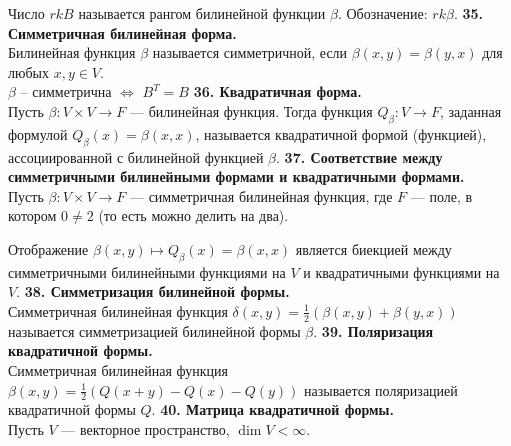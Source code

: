 \documentclass{article}
\begin{document}
Число $rk B$ называется рангом билинейной функции $\beta$. Обозначение: $rk \beta$.
\newline
\newline
\textbf{35. Симметричная билинейная форма.}\\
Билинейная функция $\beta$ называется симметричной, если $\beta(x, y) =\beta(y, x)$ для любых $x, y \in V$.\\
 $\beta$ -- симметрична $\Leftrightarrow$ $B^T=B$
\newline
\newline
\textbf{36. Квадратичная форма.}\\
Пусть $\beta \colon V\times V \rightarrow F$ --- билинейная функция. Тогда функция $Q_\beta \colon V \rightarrow F$, заданная формулой $Q_\beta(x) = \beta(x, x)$, называется квадратичной формой (функцией), ассоциированной с билинейной функцией $\beta$.
\newline
\newline
\textbf{37. Соответствие между симметричными билинейными формами и квадратичными формами.}\\
Пусть $\beta \colon V\times V \rightarrow F$ --- симметричная билинейная функция, где $F$ --- поле, в котором $0 \neq 2$ (то есть можно делить на два).

Отображение $\beta(x, y) \mapsto Q_\beta(x) = \beta(x, x)$ является биекцией между симметричными билинейными функциями на $V$ и квадратичными функциями на $V$.
\newline
\newline
\textbf{38. Симметризация билинейной формы.}\\
Симметричная билинейная функция $\delta(x, y) = \frac{1}{2}\left( \beta(x,y)+\beta(y,x)  \right)$ называется симметризацией билинейной формы $\beta$.
\newline
\newline
\textbf{39. Поляризация квадратичной формы.}\\
Симметричная билинейная функция $\beta(x, y) = \frac{1}{2}\left( Q(x + y) - Q(x) - Q(y)  \right)$ называется поляризацией квадратичной формы $Q$.
\newline
\newline
\textbf{40. Матрица квадратичной формы.}\\
Пусть $V$ --- векторное пространство, $\dim V < \infty$.
\end{document}
